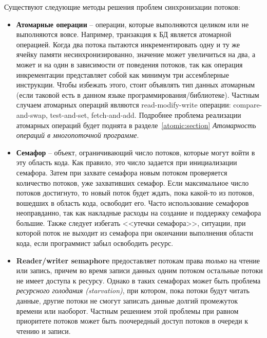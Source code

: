 Существуют следующие методы решения проблем синхронизации потоков:
\begin{itemize}
    \item\textbf{Атомарные операции} -- операции, которые выполняются целиком или не выполняются вовсе.
    Например, транзакция к БД является атомарной операцией.
    Когда два потока пытаются инкрементировать одну и ту же ячейку памяти несинхронизированно, значение может увеличиться на два, а может и на один в зависимости от поведения потоков, так как операция инкрементации представляет собой как минимум три ассемблерные инструкции.
    Чтобы избежать этого, стоит объявлять тип данных атомарным (если таковой есть в данном языке программирования/библиотеке).
    Частным случаем атомарных операций являются read-modify-write операции: compare-and-swap, test-and-set, fetch-and-add.
    Подробнее проблема реализации атомарных операций будет поднята в разделе~\ref{atomic:section} \textit{Атомарность операций в многопоточной программе}.
    
    \item\textbf{Семафор} -- объект, ограничивающий число потоков, которые могут войти в эту область кода.
    Как правило, это число задается при инициализации семафора.
    Затем при захвате семафора новым потоком проверяется количество потоков, уже захвативших семафор.
    Если максимальное число потоков достигнуто, то новый поток будет ждать, пока какой-то из потоков, вошедших в область кода, освободит его.
    Часто использование семафоров неоправданно, так как накладные расходы на создание и поддержку семафора большие.
    Также следует избегать <<утечки семафора>>, ситуации, при которой поток не выходит из семафора при окончании выполнения области кода, если программист забыл освободить ресурс.
    
    \item\textbf{Reader/writer semaphore} предоставляет потокам права \textit{только} на чтение или запись, причем во время записи данных одним потоком остальные потоки не имеет доступа к ресурсу.
    Однако в таких семафорах может быть проблема \textit{ресурсного голодания (starvation)}, при котором, пока потоки будут читать данные, другие потоки не смогут записать данные долгий промежуток времени или наоборот.
    Частным решением этой проблемы при равном приоритете потоков может быть поочередный доступ потоков в очереди к чтению и записи.
    

\end{itemize}
